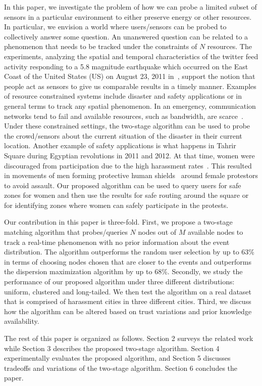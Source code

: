 \documentclass{acm_proc_article-sp}
\begin{document}
In this paper, we investigate the problem of how we can probe a limited subset of sensors in a particular environment to either preserve energy or other resources. In particular, we envision a world where users/sensors can be probed to collectively answer some question. An unanswered question can be related to a phenomenon that needs to be tracked under the constraints of $N$ resources. The experiments, analyzing the spatial and temporal characteristics of the twitter feed activity responding to a 5.8 magnitude earthquake which occurred on the East Coast of the United States (US) on August 23, 2011 in~\cite{crooks2013earthquake}, support the notion that people act as sensors to give us comparable results in a timely manner. Examples of resource constrained systems include disaster and safety applications or in general terms to track any spatial phenomenon. In an emergency, communication networks tend to fail and available resources, such as bandwidth, are scarce~\cite{manoj2007communication}. Under these constrained settings, the two-stage algorithm can be used to probe the crowd/sensors about the current situation of the disaster in their current location. Another example of safety applications is what happens in Tahrir Square during Egyptian revolutions in 2011 and 2012. At that time, women were discouraged from participation due to the high harassment rates~\cite{guardianSH}. This resulted in movements of men forming protective human shields~\cite{worldPostHS} around female protestors to avoid assault. Our proposed algorithm can be used to query users for safe zones for women and then use the results for safe routing around the square or for identifying zones where women can safely participate in the protests. \par
Our contribution in this paper is three-fold. First, we propose a two-stage matching algorithm that probes/queries $N$ nodes out of $M$ available nodes to track a real-time phenomenon with no prior information about the event distribution. The algorithm outperforms the random user selection by up to $63\%$ in terms of choosing nodes chosen that are closer to the events and outperforms the dispersion maximization algorithm by up to $68\%$. Secondly, we study the performance of our proposed algorithm under three different distributions: uniform, clustered and long-tailed. We then test the algorithm on a real dataset that is comprised of harassment cities in three different cities. Third, we discuss how the algorithm can be altered based on trust variations and prior knowledge availability.\par
The rest of this paper is organized as follows. Section 2 surveys the related work while Section 3 describes the proposed two-stage algorithm. Section 4 experimentally evaluates the proposed algorithm, and Section 5 discusses tradeoffs and variations of the two-stage algorithm. Section 6 concludes the paper.
\end{document}
